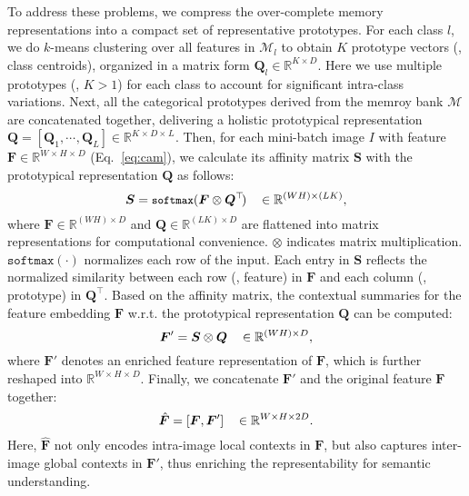\documentclass[10pt,twocolumn,letterpaper]{article}
\begin{document}
To address these problems, we  compress the over-complete memory representations into a compact set of representative prototypes. For each class $l$, we do $k$-means clustering over all features  in $\mathcal{M}_l$ to obtain $K$ prototype vectors (\ie, class centroids), organized in a matrix form  $\bm{Q}_l\!\in\!\mathbb{R}^{K\times D}$.  Here we use multiple prototypes (\ie, $K\!>\!1$) for each class to account for significant intra-class variations.
Next, all the categorical prototypes derived from the memroy bank $\mathcal{M}$ are concatenated together, delivering a holistic prototypical representation $\bm{Q} \!=\! [\bm{Q}_1, \cdots_{\!}, \bm{Q}_L] \in\mathbb{R}^{K_{\!}\times_{\!} D\times_{\!} L_{\!}}$. Then, for each mini-batch image $I$ with feature $\bm{F}\in\mathbb{R}^{W_{\!}\times_{\!} H_{\!}\times_{\!} D}$ (Eq.$_{\!}$~\ref{eq:cam}), {we  calculate its affinity matrix $\bm{S}$ with the prototypical representation $\bm{Q}$ as follows:}
\begin{equation}\small\label{eq:affinity}
	\bm{S} =  \texttt{softmax} (\bm{F}\otimes \bm{Q}^{\top_{\!\!}} )~~~\in\mathbb{R}^{(WH) \times (LK)},
\end{equation}
where $\bm{F}\!\in\!\mathbb{R}^{(WH)\times D}$ and $\bm{Q}\!\in\!\mathbb{R}^{(LK) \times D}$ are flattened into matrix representations for computational convenience. $\otimes$ indicates  matrix multiplication. $\texttt{softmax}(\cdot)$ normalizes each row of the input.  Each entry in $\bm{S}$ reflects the normalized similarity between each row (\ie, feature) in $\bm{F}$ and each column (\ie, prototype) in $\bm{Q}^\top$. Based on the affinity matrix,  the contextual summaries for the feature embedding $\bm{F}$ {w.r.t.}  the prototypical representation $\bm{Q}$ can be computed:
\begin{equation}\small\label{eq:f}
	\bm{F}' = \bm{S}\otimes\bm{Q} ~~~\in\mathbb{R}^{(WH)\times D},
\end{equation}
where ${\bm{F}}'$ denotes an enriched feature representation of $\bm{F}$, which is further reshaped into $\mathbb{R}^{W_{\!}\times_{\!} H_{\!}\times_{\!} D}$. Finally, we concatenate  $\bm{F}'$ and the original feature $\bm{F}$ together:
\vspace{-3pt}
\begin{equation}\small\label{eq:saf}
	\hat{\bm{F}} = [\bm{F}, {\bm{F}}'] ~~~\in \mathbb{R}^{W \times H \times 2D}.
	\vspace{-1pt}
\end{equation}
Here, $\hat{\bm{F}}$  not only encodes intra-image local contexts in $\bm{F}$, but also captures inter-image global  contexts  in $\bm{F}'$, thus enriching the representability for semantic understanding. 
\end{document}
